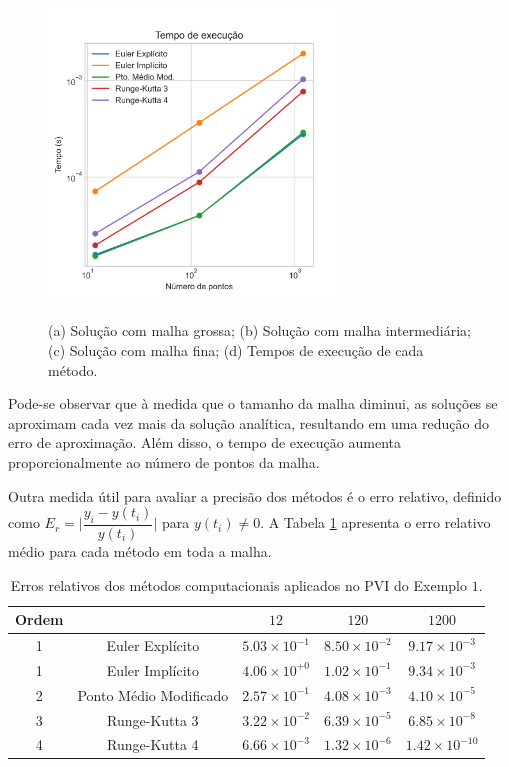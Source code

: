 \begin{figure}[H]
{{			\includegraphics[height=7.8cm, width=7.8cm]{disease/timings.png}}
	}
	\caption{(a) Solução com malha grossa; (b) Solução com malha intermediária; (c) Solução com malha fina; (d) Tempos de execução de cada método. }
    \label{img:ex1_plots}
\end{figure}

Pode-se observar que à medida que o tamanho da malha diminui, as soluções se aproximam cada vez mais da solução analítica, resultando em uma redução do erro de aproximação. Além disso, o tempo de execução aumenta proporcionalmente ao número de pontos da malha.

Outra medida útil para avaliar a precisão dos métodos é o erro relativo, definido como $E_{r} = \Bigg|\dfrac{y_i - y(t_i)}{y(t_i)}\Bigg|$ para $y(t_i) \ne 0$. A Tabela \ref{tab:ex1_relative_errors} apresenta o erro relativo médio para cada método em toda a malha.

\begin{table}\label{tabela-exemplo1}
	\centering
	\begin{tabular}{|c|c|c|c|c|}
		\hline
		Ordem & \backslashbox{Método}{Pontos} & $12$                   & $120$                  & $1200$                 \\
		\hline
        \rule{0pt}{3ex} 
		1&Euler Explícito & $5.03 \times 10^{-1}$ & $8.50 \times 10^{-2}$ & $9.17 \times 10^{-3}$ \\ \rule{0pt}{3ex} 
        1&Euler Implícito & $4.06 \times 10^{+0}$ & $1.02 \times 10^{-1}$ & $9.34 \times 10^{-3}$ \\ \rule{0pt}{3ex} 
        2&Ponto Médio Modificado & $2.57 \times 10^{-1}$ & $4.08 \times 10^{-3}$ & $4.10 \times 10^{-5}$ \\ \rule{0pt}{3ex} 
        3&Runge-Kutta 3 & $3.22 \times 10^{-2}$ & $6.39 \times 10^{-5}$ & $6.85 \times 10^{-8}$ \\ \rule{0pt}{3ex} 
        4&Runge-Kutta 4 & $6.66 \times 10^{-3}$ & $1.32 \times 10^{-6}$ & $1.42 \times 10^{-10}$ \\
		\hline
		
	\end{tabular}
 \caption{Erros relativos dos métodos computacionais aplicados no PVI do Exemplo $1$.}
 \label{tab:ex1_relative_errors}
\end{table}

